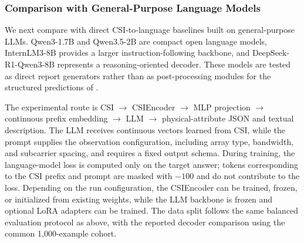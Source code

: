 \subsubsection{Comparison with General-Purpose Language Models}

We next compare with direct CSI-to-language baselines built on general-purpose LLMs. Qwen3-1.7B and
Qwen3.5-2B are compact open language models, InternLM3-8B provides a larger instruction-following
backbone, and DeepSeek-R1-Qwen3-8B represents a reasoning-oriented decoder. These models are tested
as direct report generators rather than as post-processing modules for the structured predictions of
\model{}.

The experimental route is CSI $\rightarrow$ CSIEncoder $\rightarrow$ MLP projection $\rightarrow$
continuous prefix embedding $\rightarrow$ LLM $\rightarrow$ physical-attribute JSON and textual
description. The LLM receives continuous vectors learned from CSI, while the prompt supplies the
observation configuration, including array type, bandwidth, and subcarrier spacing, and requires a
fixed output schema. During training, the language-model loss is computed only on the target answer;
tokens corresponding to the CSI prefix and prompt are masked with $-100$ and do not contribute to the
loss. Depending on the run configuration, the CSIEncoder can be trained, frozen, or initialized from
existing weights, while the LLM backbone is frozen and optional LoRA adapters can be trained. The data
split follows the same balanced evaluation protocol as above, with the reported decoder comparison
using the common 1,000-example cohort.

